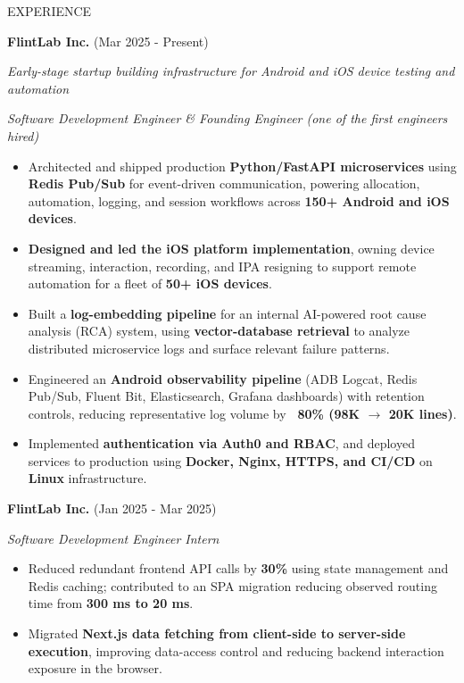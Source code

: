 \documentclass{resume}
\begin{document}
\begin{rSection}{EXPERIENCE}

\item
\textbf{FlintLab Inc.} \hfill (Mar 2025 - Present)

\textit{Early-stage startup building infrastructure for Android and iOS device testing and automation}

\textit{Software Development Engineer \& Founding Engineer (one of the first engineers hired)}

\begin{itemize}
\itemsep -4pt

\item Architected and shipped production \textbf{Python/FastAPI microservices} using \textbf{Redis Pub/Sub} for event-driven communication, powering allocation, automation, logging, and session workflows across \textbf{150+ Android and iOS devices}.

\item \textbf{Designed and led the iOS platform implementation}, owning device streaming, interaction, recording, and IPA resigning to support remote automation for a fleet of \textbf{50+ iOS devices}.

\item Built a \textbf{log-embedding pipeline} for an internal AI-powered root cause analysis (RCA) system, using \textbf{vector-database retrieval} to analyze distributed microservice logs and surface relevant failure patterns.

\item Engineered an \textbf{Android observability pipeline} (ADB Logcat, Redis Pub/Sub, Fluent Bit, Elasticsearch, Grafana dashboards) with retention controls, reducing representative log volume by \textbf{~80\% (98K $\rightarrow$ 20K lines)}.

\item Implemented \textbf{authentication via Auth0 and RBAC}, and deployed services to production using \textbf{Docker, Nginx, HTTPS, and CI/CD} on \textbf{Linux} infrastructure.

\end{itemize}

\textbf{FlintLab Inc.} \hfill (Jan 2025 - Mar 2025)

\textit{Software Development Engineer Intern}

\begin{itemize}
\itemsep -4pt

\item Reduced redundant frontend API calls by \textbf{30\%} using state management and Redis caching; contributed to an SPA migration reducing observed routing time from \textbf{300 ms to 20 ms}.

\item Migrated \textbf{Next.js data fetching from client-side to server-side execution}, improving data-access control and reducing backend interaction exposure in the browser.

\end{itemize}

\end{rSection}
\end{document}
